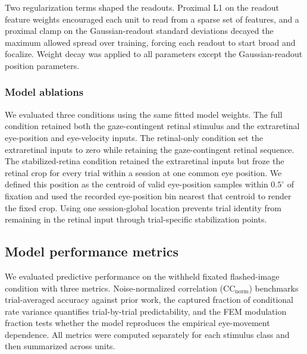 \documentclass{lite}
\begin{document}
Two regularization terms shaped the readouts. Proximal L1 on the readout feature weights encouraged each unit to read from a sparse set of features, and a proximal clamp on the Gaussian-readout standard deviations decayed the maximum allowed spread over training, forcing each readout to start broad and focalize. Weight decay was applied to all parameters except the Gaussian-readout position parameters.

\subsubsection{Model ablations}
We evaluated three conditions using the same fitted model weights. The full condition retained both the gaze-contingent retinal stimulus and the extraretinal eye-position and eye-velocity inputs. The retinal-only condition set the extraretinal inputs to zero while retaining the gaze-contingent retinal sequence. The stabilized-retina condition retained the extraretinal inputs but froze the retinal crop for every trial within a session at one common eye position. We defined this position as the centroid of valid eye-position samples within $0.5^\circ$ of fixation and used the recorded eye-position bin nearest that centroid to render the fixed crop. Using one session-global location prevents trial identity from remaining in the retinal input through trial-specific stabilization points.

\subsection{Model performance metrics}
We evaluated predictive performance on the withheld fixated flashed-image condition with three metrics. Noise-normalized correlation ($\mathrm{CC}_{\mathrm{norm}}$) benchmarks trial-averaged accuracy against prior work, the captured fraction of conditional rate variance quantifies trial-by-trial predictability, and the FEM modulation fraction tests whether the model reproduces the empirical eye-movement dependence. All metrics were computed separately for each stimulus class and then summarized across units.
\end{document}
